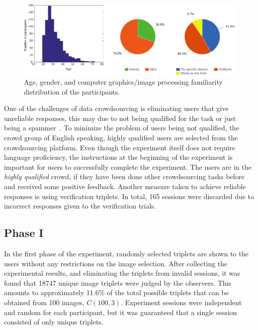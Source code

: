 \begin{figure}
\begin{center}
\includegraphics[width=\textwidth]{figures/chapter3/age_gender_cgi.pdf}
\caption{Age, gender, and computer graphics/image processing familiarity distribution of the participants.}
\label{fig:age_gender_cgi}
\end{center}
\end{figure}

One of the challenges of data crowdsourcing is eliminating users that give unreliable responses, this may due to not being qualified for the task or just being a spammer~\cite{garcia2016challenges}. To minimize the problem of users being not qualified, the crowd group of English speaking, highly qualified users are selected from the crowdsourcing platform. Even though the experiment itself does not require language proficiency, the instructions at the beginning of the experiment is important for users to successfully complete the experiment. The users are in the \emph{highly qualified} crowd, if they have been done other crowdsourcing tasks before and received some positive feedback. Another measure taken to achieve reliable responses is using verification triplets. In total, 165 sessions were discarded due to incorrect responses given to the verification trials. 

\subsection{Phase I}
\label{sec:exp_phase_I}
In the first phase of the experiment, randomly selected triplets are shown to the users without any restrictions on the image selection. After collecting the experimental results, and eliminating the triplets from invalid sessions, it was found that 18747 unique image triplets were judged by the observers. This amounts to approximately 11.6\% of the total possible triplets that can be obtained from 100 images, $C(100, 3)$. Experiment sessions were independent and random for each participant, but it was guaranteed that a single session consisted of only unique triplets. 

